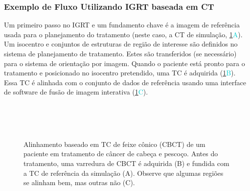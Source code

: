 \documentclass[11pt,a4paper]{article}
\begin{document}
\subsubsection*{Exemplo de Fluxo Utilizando IGRT baseada em CT}

	Um primeiro passo no IGRT e um fundamento chave é a imagem de referência usada para o planejamento do tratamento (neste caso, a CT de simulação, \ref{fig:cbctIgrt}\textcolor{DarkTurquoise}{A}). Um isocentro e conjuntos de estruturas de região de interesse são definidos no sistema de planejamento de tratamento. Estes são transferidos (se necessário) para o sistema de orientação por imagem. Quando o paciente está pronto para o tratamento e posicionado no isocentro pretendido, uma TC é adquirida (\ref{fig:cbctIgrt}\textcolor{DarkTurquoise}{B}). Essa TC é alinhada com o conjunto de dados de referência usando uma interface de software de fusão de imagem interativa (\ref{fig:cbctIgrt}\textcolor{DarkTurquoise}{C}).
	\begin{figure}[!h]
		\centering
		 \\
		 \\ %
		 \\ %
		\caption{Alinhamento baseado em TC de feixe cônico (CBCT) de um paciente em tratamento de câncer de cabeça e pescoço. Antes do tratamento, uma varredura de CBCT é adquirida (B) e fundida com a TC de referência da simulação (A). Observe que algumas regiões se alinham bem, mas outras não (C).}
		\label{fig:cbctIgrt}
	\end{figure}
\end{document}
